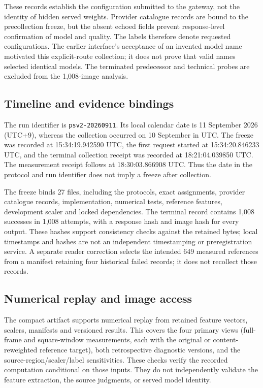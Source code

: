 These records establish the configuration submitted to the gateway, not the
identity of hidden served weights. Provider catalogue records are bound to the
precollection freeze, but the absent echoed fields prevent response-level
confirmation of model and quality. The labels therefore denote requested
configurations. The earlier interface's acceptance of an invented model name
motivated this explicit-route collection; it does not prove that valid names
selected identical models. The terminated predecessor and technical probes
are excluded from the 1,008-image analysis.

\subsection{Timeline and evidence bindings}
The run identifier is \texttt{psv2-20260911}. Its local calendar date is
11 September 2026 (UTC+9), whereas the collection occurred on 10 September
in UTC. The freeze was recorded at 15:34:19.942590 UTC, the first request
started at 15:34:20.846233 UTC, and the terminal collection receipt was
recorded at 18:21:04.039850 UTC. The measurement receipt follows at
18:30:03.866908 UTC. Thus the date in the protocol and run identifier does
not imply a freeze after collection.

The freeze binds 27 files, including the protocols, exact assignments,
provider catalogue records, implementation, numerical tests, reference
features, development scaler and locked dependencies. The terminal record
contains 1,008 successes in 1,008 attempts, with a response hash and image
hash for every output. These hashes support consistency checks against the
retained bytes; local timestamps and hashes are not an independent timestamping
or preregistration service. A separate reader correction selects the intended
649 measured references from a manifest retaining four historical failed
records; it does not recollect those records.

\subsection{Numerical replay and image access}
The compact artifact supports numerical replay from retained feature vectors,
scalers, manifests and versioned results. This covers the four primary views
(full-frame and square-window measurements, each with the original or
content-reweighted reference target), both retrospective diagnostic versions,
and the source-region/scaler/label sensitivities. These checks verify the
recorded computation conditional on those inputs. They do not independently
validate the feature extraction, the source judgments, or served model identity.

